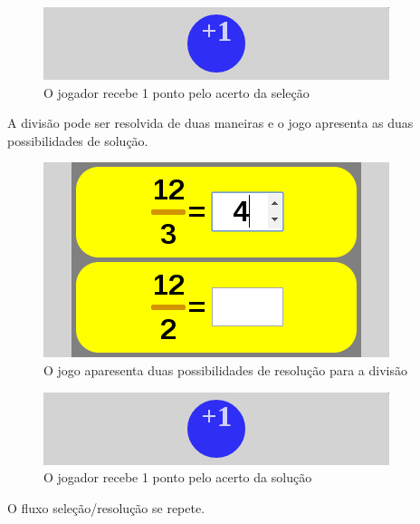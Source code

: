 \begin{figure}[H]
	\caption{\label{score_1_1}O jogador recebe 1 ponto pelo acerto da seleção}
	\begin{center}
	    \includegraphics[scale=1]{score_1.png}
	\end{center}
\end{figure}

A divisão pode ser resolvida de duas maneiras e o jogo apresenta as duas possibilidades de solução.

\begin{figure}[H]
	\caption{\label{xp_7}O jogo aparesenta duas possibilidades de resolução para a divisão}
	\begin{center}
	    \includegraphics[scale=1]{xp_4_7_rightans_2.png}
	\end{center}
\end{figure}

\begin{figure}[H]
	\caption{\label{score_1_2}O jogador recebe 1 ponto pelo acerto da solução}
	\begin{center}
	    \includegraphics[scale=1]{score_1.png}
	\end{center}
\end{figure}

O fluxo seleção/resolução se repete.

